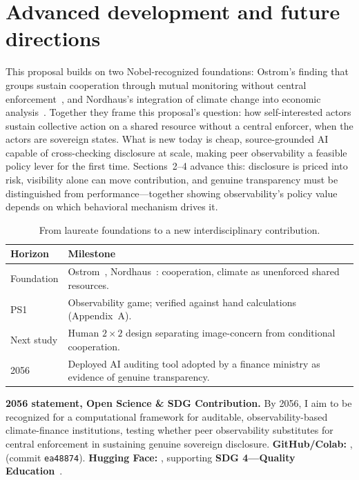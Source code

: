 \section{Advanced development and future directions}
This proposal builds on two Nobel-recognized foundations: Ostrom's finding that groups sustain cooperation through mutual monitoring without central enforcement~\cite{ostrom1990,nobelostrom2009}, and Nordhaus's integration of climate change into economic analysis~\cite{nordhaus1992,nobelnordhaus2018}. Together they frame this proposal's question: how self-interested actors sustain collective action on a shared resource without a central enforcer, when the actors are sovereign states. What is new today is cheap, source-grounded AI capable of cross-checking disclosure at scale, making peer observability a feasible policy lever for the first time. Sections~2--4 advance this: disclosure is priced into risk, visibility alone can move contribution, and genuine transparency must be distinguished from performance---together showing observability's policy value depends on which behavioral mechanism drives it.

\begin{table}[h]\caption{From laureate foundations to a new interdisciplinary contribution.}
\begin{tabularx}{\columnwidth}{@{}p{1.6cm}Y@{}}\toprule
\textbf{Horizon}&\textbf{Milestone}\\\midrule
Foundation&Ostrom~\cite{ostrom1990}, Nordhaus~\cite{nordhaus1992}: cooperation, climate as unenforced shared resources.\\
PS1&Observability game; verified against hand calculations (Appendix~A).\\
Next study&Human $2\times2$ design separating image-concern from conditional cooperation.\\
2056&Deployed AI auditing tool adopted by a finance ministry as evidence of genuine transparency.\\\bottomrule
\end{tabularx}\end{table}

\noindent\textbf{2056 statement, Open Science \& SDG Contribution.} By 2056, I aim to be recognized for a computational framework for auditable, observability-based climate-finance institutions, testing whether peer observability substitutes for central enforcement in sustaining genuine sovereign disclosure. \textbf{GitHub/Colab:} \GitHubLink, \ColabLink (commit \texttt{ea48874}). \textbf{Hugging Face:} \DemoLink, supporting \textbf{SDG 4---Quality Education}~\cite{sdg4}.